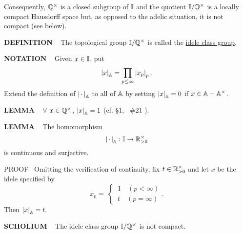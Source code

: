 \vspace{0.1cm}


Consequently, $\mathbb{Q}^\times$ is a closed subgroup of $\mathbb{I}$ and the quotient $\mathbb{I}/\mathbb{Q}^\times$ is a locally compact Hausdorff space but, as opposed to the adelic situation, it is not compact (see below).

\vspace{0.2cm}

\begin{x}{\small\bf DEFINITION} \ %
The topological group $\mathbb{I}/\mathbb{Q}^\times$ is called the 
\underline{idele class group}.
\end{x}

\vspace{0.1cm}

\begin{x}{\small\bf NOTATION} \ %
Given $x \in \mathbb{I}$, put
\[
\left\vert x\right\vert_{\mathbb{A}} = \prod_{p \le \infty} \left\vert x_p\right\vert_p.
\]
Extend the definition of $\left\vert\hspace{0.05cm} \cdot \hspace{0.05cm}\right\vert_{\mathbb{A}}$ to all of $\mathbb{A}$ by setting $\left\vert x\right\vert_{\mathbb{A}} = 0$ if $x \in \mathbb{A}  - \mathbb{A}^\times$.
\end{x}

\vspace{0.1cm}


\begin{x}{\small\bf LEMMA} \ %
$\forall$ $x \in \mathbb{Q}^\times$, $\left\vert x\right\vert_{\mathbb{A}} = 1$ (cf. \S1, \  \#21 ).
\end{x}

\vspace{0.1cm}


\begin{x}{\small\bf LEMMA} \ %
The homomorphism
\[
\left\vert\hspace{0.05cm} \cdot \hspace{0.05cm}\right\vert_{\mathbb{A}} : \mathbb{I} \rightarrow \mathbb{R}_{> 0}^\times
\]
is continuous and surjective.

\vspace{0.1cm}

PROOF \ 
Omitting the verification of continuity, fix $t \in \mathbb{R}_{> 0}^\times$ and let $x$ be the idele specified by
\[x_p = \ 
\begin{cases}
\ 1 \quad \text{$(p < \infty)$}\\
\ t \quad \text{$(p = \infty)$}
\end{cases}
.\]
Then $\left\vert x\right\vert_{\mathbb{A}} = t.$
\end{x}

\vspace{0.1cm}



\begin{x}{\small\bf SCHOLIUM} \ %
The idele class group $\mathbb{I}/\mathbb{Q}^\times$ is not compact.
\end{x}

